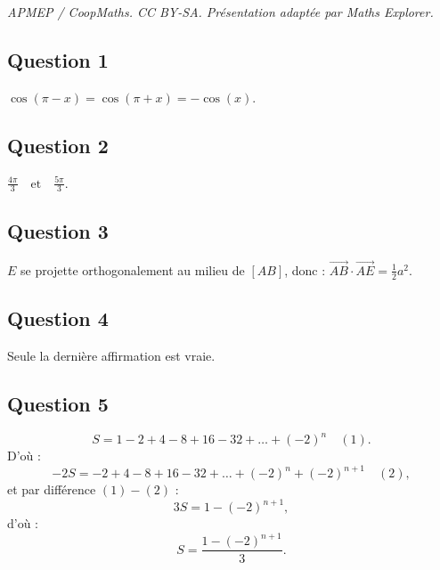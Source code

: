 \documentclass[10pt]{article}
\begin{document}
\noindent\textit{APMEP / CoopMaths. CC BY-SA. Présentation adaptée par Maths Explorer.}\par\medskip
\subsection*{Question 1}

\(\cos(\pi - x) = \cos(\pi + x) = - \cos(x)\).

\subsection*{Question 2}

\(\frac{4\pi}{3} \quad \text{et} \quad \frac{5\pi}{3}\).

\subsection*{Question 3}

\( E \) se projette orthogonalement au milieu de \([AB]\), donc : \(\overrightarrow{AB} \cdot \overrightarrow{AE} = \frac{1}{2} a^2\).

\subsection*{Question 4}

Seule la dernière affirmation est vraie.

\subsection*{Question 5}

\[
S = 1 - 2 + 4 - 8 + 16 - 32 + \dots + (-2)^n \quad (1).
\]
D'où :
\[
-2S = -2 + 4 - 8 + 16 - 32 + \dots + (-2)^n + (-2)^{n+1} \quad (2),
\]
et par différence \( (1) - (2) \) :
\[
3S = 1 - (-2)^{n+1},
\]
d'où :
\[
S = \frac{1 - (-2)^{n+1}}{3}.
\]
\end{document}
